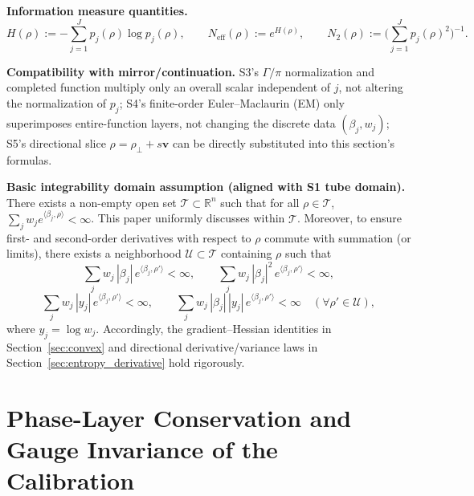 \documentclass[11pt,a4paper]{article}
\theoremstyle{remark}
\begin{document}
\textbf{Information measure quantities.}
\begin{equation}
H(\rho):=-\sum_{j=1}^J p_j(\rho)\log p_j(\rho),\qquad
N_{\mathrm{eff}}(\rho):=e^{H(\rho)},\qquad
N_2(\rho):=\Big(\sum_{j=1}^J p_j(\rho)^2\Big)^{-1}.
\end{equation}

\textbf{Compatibility with mirror/continuation.} S3's $\Gamma/\pi$ normalization and completed function multiply only an overall scalar independent of $j$, not altering the normalization of $p_j$; S4's finite-order Euler--Maclaurin (EM) only superimposes entire-function layers, not changing the discrete data $(\beta_j,w_j)$; S5's directional slice $\rho=\rho_\perp+s\mathbf{v}$ can be directly substituted into this section's formulas.

\textbf{Basic integrability domain assumption (aligned with S1 tube domain).} There exists a non-empty open set $\mathcal{T}\subset\mathbb{R}^n$ such that for all $\rho\in\mathcal{T}$, $\sum_j w_j e^{\langle \beta_j,\rho\rangle}<\infty$. This paper uniformly discusses within $\mathcal{T}$. Moreover, to ensure first- and second-order derivatives with respect to $\rho$ commute with summation (or limits), there exists a neighborhood $\mathcal{U}\subset\mathcal{T}$ containing $\rho$ such that
\begin{equation}
\sum_j w_j\,|\beta_j|\,e^{\langle\beta_j,\rho'\rangle}<\infty,\qquad
\sum_j w_j\,|\beta_j|^2\,e^{\langle\beta_j,\rho'\rangle}<\infty,
\end{equation}
\begin{equation}
\sum_j w_j\,|y_j|\,e^{\langle\beta_j,\rho'\rangle}<\infty,\qquad
\sum_j w_j\,|\beta_j|\,|y_j|\,e^{\langle\beta_j,\rho'\rangle}<\infty\quad(\forall\rho'\in\mathcal{U}),
\end{equation}
where $y_j=\log w_j$. Accordingly, the gradient--Hessian identities in Section~\ref{sec:convex} and directional derivative/variance laws in Section~\ref{sec:entropy_derivative} hold rigorously.

\section{Phase-Layer Conservation and Gauge Invariance of the Calibration}
\end{document}
